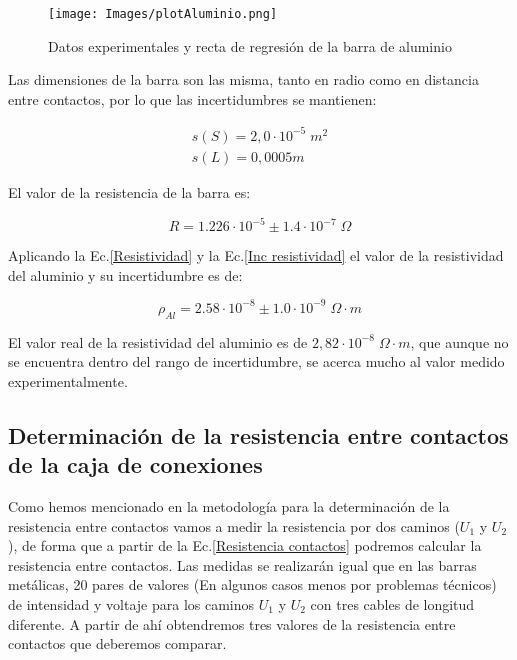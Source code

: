 \documentclass[a4paper,12pt,titlepage]{article}
\begin{document}
\begin{figure}[h!]
    \centering
    \texttt{[image: Images/plotAluminio.png]}
    \caption{Datos experimentales y recta de regresión de la barra de aluminio}
\end{figure}

Las dimensiones de la barra son las misma, tanto en radio como en distancia entre contactos, por lo que las incertidumbres se mantienen:

\begin{equation}
    \begin{gathered}
        s(S) = 2,0\cdot 10^{-5} \; m^2 \\
        s(L) = 0,0005m
    \end{gathered}
\end{equation}

El valor de la resistencia de la barra es:

\begin{equation}
    R = 1.226 \cdot 10^{-5} \pm 1.4 \cdot 10^{-7} \; \Omega
\end{equation}

Aplicando la Ec.\ref{Resistividad} y la Ec.\ref{Inc resistividad} el valor de la resistividad del aluminio y su incertidumbre es de:

\begin{equation}
    \rho_{Al} = 2.58 \cdot 10^{-8} \pm
    1.0\cdot 10^{-9} \; \Omega \cdot m
\end{equation}

El valor real de la resistividad del aluminio es de $2,82 \cdot 10^{-8} \; \Omega \cdot m$, que aunque no se encuentra dentro del rango de incertidumbre, se acerca mucho al valor medido experimentalmente.

\subsection{Determinación de la resistencia entre contactos de la caja de conexiones}

Como hemos mencionado en la metodología para la determinación de la resistencia entre contactos vamos a medir la resistencia por dos caminos ($U_{1}$ y $U_{2}$), de forma que a partir de la Ec.\ref{Resistencia contactos} podremos calcular la resistencia entre contactos. Las medidas se realizarán igual que en las barras metálicas, 20 pares de valores (En algunos casos menos por problemas técnicos) de intensidad y voltaje para los caminos $U_{1}$ y $U_{2}$ con tres cables de longitud diferente. A partir de ahí obtendremos tres valores de la resistencia entre contactos que deberemos comparar.
\end{document}
